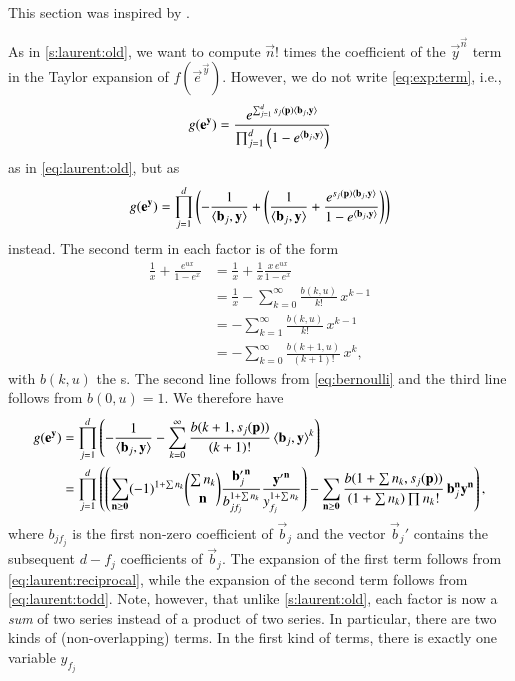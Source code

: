 This section was inspired by .

As in \autoref{s:laurent:old}, we want to compute
$\vec n!$ times the coefficient of the $\vec y^{\vec n}$ term
in the Taylor expansion of $f(\vec e^{\vec y})$.
However, we do not write \eqref{eq:exp:term}, i.e.,
$$
g(\vec e^{\vec y}) =
	\frac{e^{\sum_{j=1}^d s_j(\vec p) \sp{b_j}y}}
	     {\prod_{j=1}^{d}\left(1-e^{\sp{b_j}y}\right)}
$$
as in \eqref{eq:laurent:old},
but as
$$
g(\vec e^{\vec y}) =
	\prod_{j=1}^d \left(-\frac 1 {\sp{b_j}y} + 
	    \left(\frac 1 {\sp{b_j}y} + 
	    \frac{e^{s_j(\vec p)\sp{b_j}y}}
				 {1-e^{\sp{b_j}y}} \right)\right)
$$
instead.
The second term in each factor is of the form
\begin{align*}
\frac 1 x +
\frac{e^{ux}}{1-e^x}
& =
\frac 1 x +
\frac 1 x \frac{x \, e^{ux}}{1-e^x}
\\
& =
\frac 1 x
- \sum_{k=0}^{\infty} \frac{b(k,u)}{k!} \, x^{k-1}
\\
& =
- \sum_{k=1}^{\infty} \frac{b(k,u)}{k!} \, x^{k-1}
\\
& =
- \sum_{k=0}^{\infty} \frac{b(k+1,u)}{(k+1)!} \, x^{k}
,
\end{align*}
with $b(k,u)$ the s.
The second line follows from \eqref{eq:bernoulli}
and the third line follows from $b(0,u) = 1$.
We therefore have
\begin{align*}
g(\vec e^{\vec y})
&=
\prod_{j=1}^d \left(
	- \frac 1 {\sp{b_j}y} 
	- \sum_{k=0}^{\infty}
		\frac{b(k+1,s_j(\vec p))}{(k+1)!} \, {\sp{b_j}y}^{k}
     \right)
\\
&=
\prod_{j=1}^d \left(
	\left(
    \sum_{\vec n \ge \vec 0}
		(-1)^{1+\sum n_k}
	{\sum n_k \choose \vec n}
		    \frac{{\vec b'_j}^{\vec n}}{b_{jf_j}^{1+\sum n_k}}
		    \frac{{\vec y'}^{\vec n}}{y_{f_j}^{1+\sum n_k}}
	\right)
    - \sum_{\vec n \ge \vec 0}
	    \frac{b(1+\sum n_k,s_j(\vec p))}{(1+\sum n_k)\prod n_k!} \,
		\vec b_j^{\vec n} \vec y^{\vec n}
     \right)
,
\end{align*}
where $b_{jf_j}$ is the first non-zero coefficient of $\vec b_j$
and the vector $\vec b_j'$ contains
the subsequent $d-f_j$ coefficients of $\vec b_j$.
The expansion of the first term follows from \eqref{eq:laurent:reciprocal},
while the expansion of the second term follows from \eqref{eq:laurent:todd}.
Note, however, that unlike \autoref{s:laurent:old}, each factor is
now a {\em sum} of two series instead of a product of two series.
In particular, there are two kinds of (non-overlapping) terms.
In the first kind of terms, there is exactly one variable $y_{f_j}$
